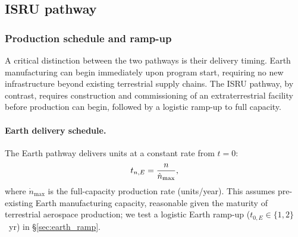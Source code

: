\documentclass[5p,twocolumn]{elsarticle}
\begin{document}
\subsection{ISRU pathway}

\subsubsection{Production schedule and ramp-up}

A critical distinction between the two pathways is their delivery timing. Earth manufacturing can begin immediately upon program start, requiring no new infrastructure beyond existing terrestrial supply chains. The ISRU pathway, by contrast, requires construction and commissioning of an extraterrestrial facility before production can begin, followed by a logistic ramp-up to full capacity.

\paragraph{Earth delivery schedule.} The Earth pathway delivers units at a constant rate from $t = 0$:
\begin{equation}\small
  t_{n,E} = \frac{n}{\dot{n}_{\max}},
  \label{eq:earth_schedule}
\end{equation}
where $\dot{n}_{\max}$ is the full-capacity production rate (units/year). This assumes pre-existing Earth manufacturing capacity, reasonable given the maturity of terrestrial aerospace production; we test a logistic Earth ramp-up ($t_{0,E} \in \{1, 2\}$~yr) in \S\ref{sec:earth_ramp}.
\end{document}
